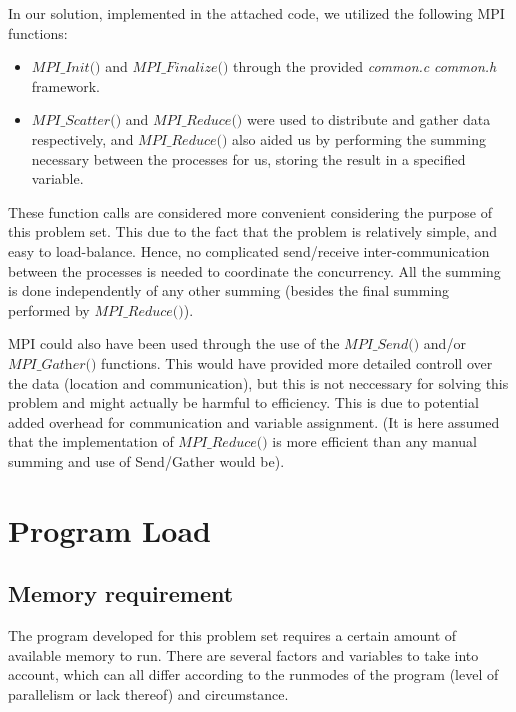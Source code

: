 \documentclass[fontsize=11pt,paper=a4,titlepage]{report}
\begin{document}
In our solution, implemented in the attached code, we utilized the following MPI
functions:

\begin{itemize}
	\item{$\textit{MPI\_Init()}$ and $\textit{
MPI\_Finalize()}$ through the provided \textit{common.c} \textit{common.h}
framework.}
	\item{$\textit{MPI\_Scatter()}$ and $\textit{MPI\_Reduce()}$ were used to distribute
	and gather data respectively, and
	$\textit{MPI\_Reduce()}$ also aided us by performing the summing necessary
	between the processes for us, storing the result in a specified variable.}
\end{itemize}

These function calls are considered more convenient considering the purpose of
this problem set. This due to the fact that the problem is relatively simple,
and easy to load-balance. Hence, no complicated send/receive inter-communication
between the processes is needed to coordinate the concurrency. All the summing
is done independently of any other summing (besides the final summing performed
by $\textit{MPI\_Reduce()}$).

MPI could also have been used through the use of the $\textit{MPI\_Send()}$
and/or $\textit{MPI\_Gather()}$ functions. This would have provided more
detailed controll over the data (location and communication), but this is not
neccessary for solving this problem and might actually be harmful to efficiency.
This is due to potential added overhead for communication and variable
assignment. (It is here assumed that the implementation of
$\textit{MPI\_Reduce()}$ is more efficient than any manual summing and use of
Send/Gather would be).


\section{Program Load}

\subsection{Memory requirement}
\label{subsec:MemReq}

The program developed for this problem set requires a certain amount of
available memory to run. There are several factors and variables to take into
account, which can all differ according to the runmodes of the program (level of
parallelism or lack thereof) and circumstance.
\end{document}
